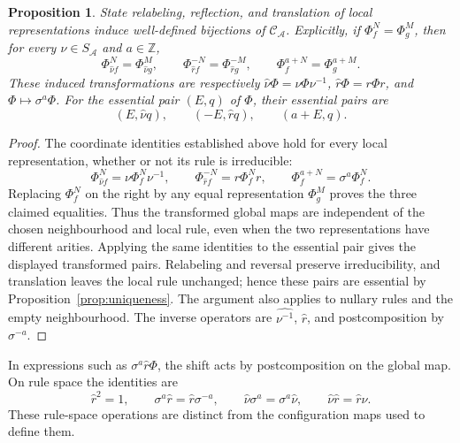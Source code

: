 \documentclass[11pt,a4paper]{article}
\newenvironment{revision}{\color{blue}}{}
\newenvironment{revision}{\color{black}}{}
\newcommand{\locmark}[1]{\label{#1}\linelabel{line:#1}}
\newtheorem{prop}{Proposition}
\begin{document}
\begin{revision}
\begin{prop}\label{prop:intrinsic-action}\locmark{loc:action}
State relabeling, reflection, and translation of local representations
induce well-defined bijections of $\mathcal C_{\mathcal A}$.
Explicitly, if $\Phi_f^N=\Phi_g^M$, then for every
$\nu\in S_{\mathcal A}$ and $a\in\mathbb Z$,
\[
\Phi_{\hat\nu f}^{N}=\Phi_{\hat\nu g}^{M},\qquad
\Phi_{\hat r f}^{-N}=\Phi_{\hat r g}^{-M},\qquad
\Phi_f^{a+N}=\Phi_g^{a+M}.
\]
These induced transformations are respectively
$\hat\nu\Phi=\nu\Phi\nu^{-1}$, $\hat r\Phi=r\Phi r$, and
$\Phi\mapsto\sigma^a\Phi$.
For the essential pair $(E,q)$ of $\Phi$, their essential pairs are
\[
(E,\hat\nu q),\qquad (-E,\hat r q),\qquad (a+E,q).
\]
\end{prop}
\begin{proof}
The coordinate identities established above hold for every local
representation, whether or not its rule is irreducible:
\[
\Phi_{\hat\nu f}^{N}=\nu\Phi_f^N\nu^{-1},\qquad
\Phi_{\hat r f}^{-N}=r\Phi_f^N r,\qquad
\Phi_f^{a+N}=\sigma^a\Phi_f^N.
\]
Replacing $\Phi_f^N$ on the right by any equal representation
$\Phi_g^M$ proves the three claimed equalities. Thus the transformed
global maps are independent of the chosen neighbourhood and local rule,
even when the two representations have different arities.
Applying the same identities to the essential pair gives the displayed
transformed pairs. Relabeling and reversal preserve irreducibility,
and translation leaves the local rule unchanged; hence these pairs
are essential by Proposition~\ref{prop:uniqueness}. The argument also
applies to nullary rules and the empty neighbourhood.
The inverse operators are $\widehat{\nu^{-1}}$, $\hat r$, and
postcomposition by $\sigma^{-a}$.
\end{proof}
In expressions such as $\sigma^a\hat r\Phi$, the shift acts by
postcomposition on the global map. On rule space the identities are
\[
\hat r^2=1,\qquad
\sigma^a\hat r=\hat r\sigma^{-a},\qquad
\hat\nu\sigma^a=\sigma^a\hat\nu,
\qquad \hat\nu\hat r=\hat r\hat\nu.
\]
These rule-space operations are distinct from the configuration maps used
to define them.
\end{revision}
\end{document}
